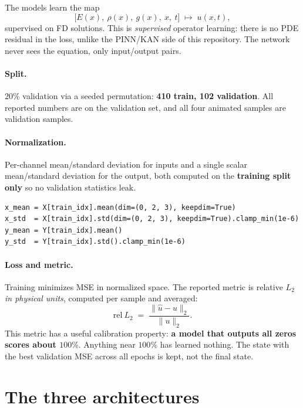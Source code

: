 \documentclass[11pt,a4paper]{article}
\newcommand{\relL}{relative $L_2$}
\begin{document}
The models learn the map
\begin{equation}
\bigl[E(x),\ \rho(x),\ g(x),\ x,\ t\bigr] \;\longmapsto\; u(x,t),
\end{equation}
supervised on FD solutions. This is \emph{supervised} operator learning: there
is no PDE residual in the loss, unlike the PINN/KAN side of this repository. The
network never sees the equation, only input/output pairs.

\paragraph{Split.} $20\%$ validation via a seeded permutation: \textbf{410
train, 102 validation}. All reported numbers are on the validation set, and all
four animated samples are validation samples.

\paragraph{Normalization.} Per-channel mean/standard deviation for inputs and a
single scalar mean/standard deviation for the output, both computed on the
\textbf{training split only} so no validation statistics leak.

\begin{lstlisting}
x_mean = X[train_idx].mean(dim=(0, 2, 3), keepdim=True)
x_std  = X[train_idx].std(dim=(0, 2, 3), keepdim=True).clamp_min(1e-6)
y_mean = Y[train_idx].mean()
y_std  = Y[train_idx].std().clamp_min(1e-6)
\end{lstlisting}

\paragraph{Loss and metric.} Training minimizes MSE in normalized space. The
reported metric is \relL{} \emph{in physical units}, computed per sample and
averaged:
\begin{equation}
\text{rel}\ L_2 \;=\; \frac{\lVert \hat{u}-u\rVert_2}{\lVert u\rVert_2}.
\end{equation}
This metric has a useful calibration property: \textbf{a model that outputs all
zeros scores about $100\%$}. Anything near $100\%$ has learned nothing. The
state with the best validation MSE across all epochs is kept, not the final
state.

\section{The three architectures}
\end{document}
